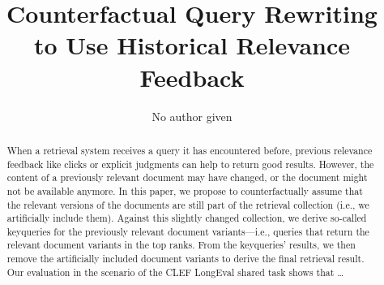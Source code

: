 \title{Counterfactual Query Rewriting \\ to Use Historical Relevance Feedback}


\author{No author given}
%
%
%
\maketitle              %
%
\begin{abstract}
When a retrieval system receives a query it has encountered before, previous relevance feedback like clicks or explicit judgments can help to return good results. However, the content of a previously relevant document may have changed, or the document might not be available anymore. In this paper, we propose to counterfactually assume that the relevant versions of the documents are still part of the retrieval collection (i.e., we artificially include them). Against this slightly changed collection, we derive so-called keyqueries for the previously relevant document variants---i.e., queries that return the relevant document variants in the top ranks. From the keyqueries' results, we then remove the artificially included document variants to derive the final retrieval result. Our evaluation in the scenario of the CLEF LongEval shared task shows that \ldots

\end{abstract}
